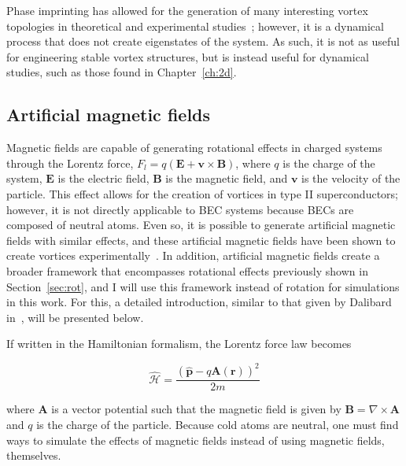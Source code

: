 Phase imprinting has allowed for the generation of many interesting vortex topologies in theoretical and experimental studies~\cite{white2014, maucher2016}; however, it is a dynamical process that does not create eigenstates of the system.
As such, it is not as useful for engineering stable vortex structures, but is instead useful for dynamical studies, such as those found in Chapter~\ref{ch:2d}.

\subsection{Artificial magnetic fields}
\label{sec:gauge}

Magnetic fields are capable of generating rotational effects in charged systems through the Lorentz force, $F_l = q(\mathbf{E} + \mathbf{v} \times \mathbf{B})$, where $q$ is the charge of the system, $\mathbf{E}$ is the electric field, $\mathbf{B}$ is the magnetic field, and $\mathbf{v}$ is the velocity of the particle.
This effect allows for the creation of vortices in type II superconductors; however, it is not directly applicable to BEC systems because BECs are composed of neutral atoms.
Even so, it is possible to generate artificial magnetic fields with similar effects, and these artificial magnetic fields have  been shown to create vortices experimentally~\cite{lin2009}.
In addition, artificial magnetic fields create a broader framework that encompasses rotational effects previously shown in Section~\ref{sec:rot}, and I will use this framework instead of rotation for simulations in this work.
For this, a detailed introduction, similar to that given by Dalibard in~\cite{dalibard2015}, will be presented below.

If written in the Hamiltonian formalism, the Lorentz force law becomes

\begin{equation}
\mathcal{\hat{H}} = \frac{(\mathbf{\hat p} - q\mathbf{A}(\mathbf{r}))^2}{2m}
\end{equation}

\noindent where $\mathbf{A}$ is a vector potential such that the magnetic field is given by $\mathbf{B} = \nabla \times \mathbf{A}$ and $q$ is the charge of the particle.
Because cold atoms are neutral, one must find ways to simulate the effects of magnetic fields instead of using magnetic fields, themselves.

